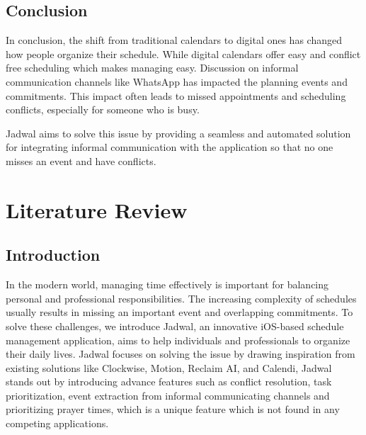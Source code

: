 \documentclass[12pt,a4paper]{report}
\begin{document}
\section{Conclusion}

In conclusion, the shift from traditional calendars to digital ones has changed how people organize their schedule.
While digital calendars offer easy and conflict free scheduling which makes managing easy.
Discussion on informal communication channels like WhatsApp has impacted the planning events and commitments.
This impact often leads to missed appointments and scheduling conflicts, especially for someone who is busy.

Jadwal aims to solve this issue by providing a seamless and automated solution for integrating informal communication with the application so that no one misses an event and have conflicts.

\chapter{Literature Review}

\section{Introduction}
In the modern world, managing time effectively is important for balancing personal and professional responsibilities.
The increasing complexity of schedules usually results in missing an important event and overlapping commitments.
To solve these challenges, we introduce Jadwal, an innovative iOS-based schedule management application, aims to help individuals and professionals to organize their daily lives.
Jadwal focuses on solving the issue by drawing inspiration from existing solutions like Clockwise, Motion, Reclaim AI, and Calendi, Jadwal stands out by introducing advance features such as conflict resolution, task prioritization, event extraction from informal communicating channels and prioritizing prayer times, which is a unique feature which is not found in any competing applications.
\end{document}

